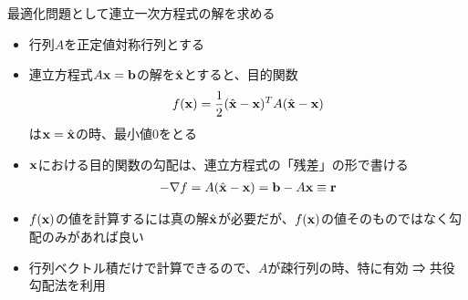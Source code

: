 \begin{frame}[t,fragile]{最適化問題として連立一次方程式の解を求める}
  \begin{itemize}
  \item 行列$A$を正定値対称行列とする
  \item 連立方程式$A{\bf x}={\bf b}$の解を$\hat{\bf x}$とすると、目的関数
    \begin{align*}
      f({\bf x}) = \frac{1}{2} (\hat{\bf x} - {\bf x})^T A (\hat{\bf x} - {\bf x})
    \end{align*}
    は${\bf x} = \hat{\bf x}$の時、最小値0をとる
  \item ${\bf x}$における目的関数の勾配は、連立方程式の「残差」の形で書ける
    \begin{align*}
      -\nabla f = A (\hat{\bf x} - {\bf x}) = {\bf b} - A {\bf x} \equiv {\bf r}
    \end{align*}
  \item $f({\bf x})$の値を計算するには真の解$\hat{\bf x}$が必要だが、$f({\bf x})$の値そのものではなく勾配のみがあれば良い
  \item 行列ベクトル積だけで計算できるので、$A$が疎行列の時、特に有効 ⇒ 共役勾配法を利用
  \end{itemize}
\end{frame}
